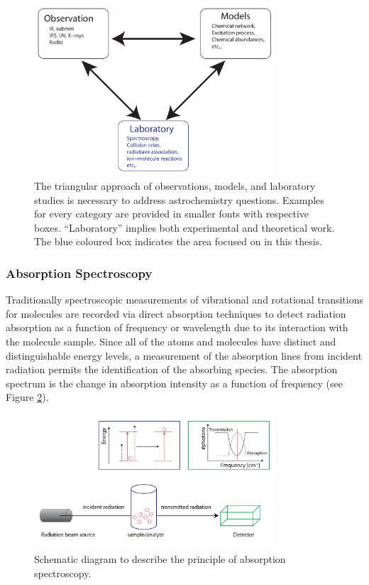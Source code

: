 \begin{figure}[!htb]
    \centering
    \includegraphics[width=0.8\textwidth]{figures/intro/astrochemistry-flow-chart.pdf}
    \caption{The triangular approach of observations, models, and laboratory studies is necessary to address astrochemistry questions. Examples for every category are provided in smaller fonts with respective boxes. \enquote{Laboratory} implies both experimental and theoretical work. The blue coloured box indicates the area focused on in this thesis.}
    \label{fig:astrochemistry-flow-chart}

\end{figure}

\subsubsection*{Absorption Spectroscopy}

Traditionally spectroscopic measurements of vibrational and rotational
transitions for molecules are recorded via direct absorption techniques to
detect radiation absorption as a function of frequency or wavelength due to its
interaction with the molecule sample. Since all of the atoms and molecules have
distinct and distinguishable energy levels, a measurement of the absorption
lines from incident radiation permits the identification of the absorbing
species. The absorption spectrum is the change in absorption intensity as a
function of frequency (see Figure \ref{fig:absorption_spectroscopy}).\\

\begin{figure}[!htb]
    \centering
    \includegraphics[width=0.8\textwidth]{figures/intro/Absorption.png}
    \caption{Schematic diagram to describe the principle of absorption spectroscopy.}
    \label{fig:absorption_spectroscopy}
\end{figure}

